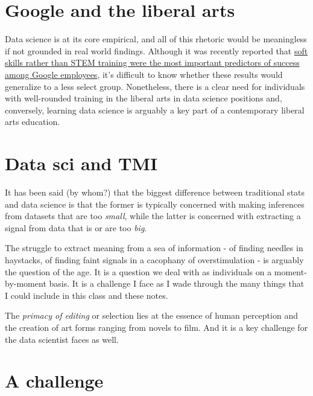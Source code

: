 \documentclass[]{book}
\theoremstyle{definition}
\theoremstyle{definition}
\theoremstyle{definition}
\theoremstyle{remark}
\begin{document}
\section{Google and the liberal arts}\label{google-and-the-liberal-arts}

Data science is at its core empirical, and all of this rhetoric would be
meaningless if not grounded in real world findings. Although it was
recently reported that
\href{https://www.washingtonpost.com/news/answer-sheet/wp/2017/12/20/the-surprising-thing-google-learned-about-its-employees-and-what-it-means-for-todays-students/?sw_bypass=true\&utm_term=.23e48235d66e}{soft
skills rather than STEM training were the most important predictors of
success among Google employees}, it's difficult to know whether these
results would generalize to a less select group. Nonetheless, there is a
clear need for individuals with well-rounded training in the liberal
arts in data science positions and, conversely, learning data science is
arguably a key part of a contemporary liberal arts education.

\section{Data sci and TMI}\label{data-sci-and-tmi}

It has been said (by whom?) that the biggest difference between
traditional stats and data science is that the former is typically
concerned with making inferences from datasets that are too
\emph{small}, while the latter is concerned with extracting a signal
from data that is or are too \emph{big}.

The struggle to extract meaning from a sea of information - of finding
needles in haystacks, of finding faint signals in a cacophany of
overstimulation - is arguably the question of the age. It is a question
we deal with as individuals on a moment-by-moment basis. It is a
challenge I face as I wade through the many things that I could include
in this class and these notes.

The \emph{primacy of editing} or selection lies at the essence of human
perception and the creation of art forms ranging from novels to film.
And it is a key challenge for the data scientist faces as well.

\section{A challenge}\label{a-challenge}
\end{document}
